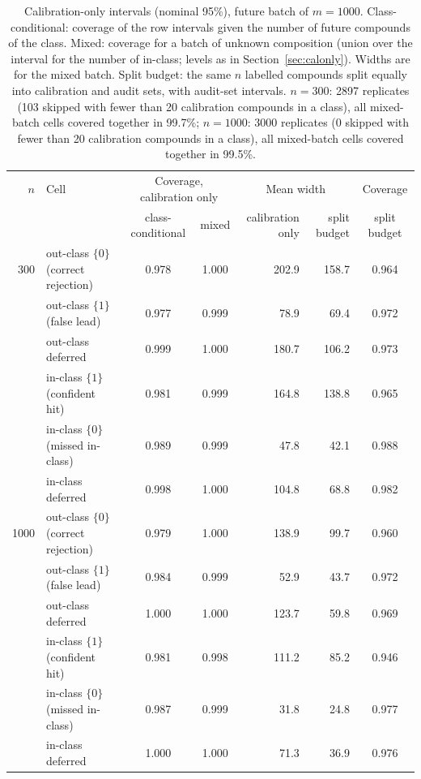 \begin{table}[ht]
\centering
\caption{Calibration-only intervals (nominal 95\%), future batch of $m=1000$. Class-conditional: coverage of the row intervals given the number of future compounds of the class. Mixed: coverage for a batch of unknown composition (union over the interval for the number of in-class; levels as in Section~\ref{sec:calonly}). Widths are for the mixed batch. Split budget: the same $n$ labelled compounds split equally into calibration and audit sets, with audit-set intervals. $n=300$: 2897 replicates (103 skipped with fewer than 20 calibration compounds in a class), all mixed-batch cells covered together in 99.7\%; $n=1000$: 3000 replicates (0 skipped with fewer than 20 calibration compounds in a class), all mixed-batch cells covered together in 99.5\%.}
\label{tab:calonly}
\small
\begin{tabular}{rlccrrc}
\toprule
$n$ & Cell & \multicolumn{2}{c}{Coverage, calibration only} & \multicolumn{2}{c}{Mean width} & Coverage \\
 & & class-conditional & mixed & calibration only & split budget & split budget \\
\midrule
300 & out-class $\{0\}$ (correct rejection) & 0.978 & 1.000 & 202.9 & 158.7 & 0.964 \\
 & out-class $\{1\}$ (false lead) & 0.977 & 0.999 & 78.9 & 69.4 & 0.972 \\
 & out-class deferred & 0.999 & 1.000 & 180.7 & 106.2 & 0.973 \\
 & in-class $\{1\}$ (confident hit) & 0.981 & 0.999 & 164.8 & 138.8 & 0.965 \\
 & in-class $\{0\}$ (missed in-class) & 0.989 & 0.999 & 47.8 & 42.1 & 0.988 \\
 & in-class deferred & 0.998 & 1.000 & 104.8 & 68.8 & 0.982 \\
\midrule
1000 & out-class $\{0\}$ (correct rejection) & 0.979 & 1.000 & 138.9 & 99.7 & 0.960 \\
 & out-class $\{1\}$ (false lead) & 0.984 & 0.999 & 52.9 & 43.7 & 0.972 \\
 & out-class deferred & 1.000 & 1.000 & 123.7 & 59.8 & 0.969 \\
 & in-class $\{1\}$ (confident hit) & 0.981 & 0.998 & 111.2 & 85.2 & 0.946 \\
 & in-class $\{0\}$ (missed in-class) & 0.987 & 0.999 & 31.8 & 24.8 & 0.977 \\
 & in-class deferred & 1.000 & 1.000 & 71.3 & 36.9 & 0.976 \\
\bottomrule
\end{tabular}
\end{table}

